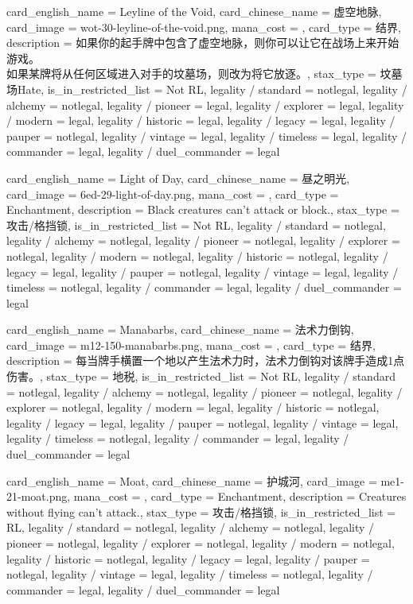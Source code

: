 \documentclass[lang = cn, color = black, 10pt]{AllThatStax}
\begin{document}
\card
{
	card_english_name = {Leyline of the Void},
	card_chinese_name = {虚空地脉},
	card_image = wot-30-leyline-of-the-void.png,
	mana_cost = ,
	card_type = 结界,
	description = {如果你的起手牌中包含了虚空地脉，则你可以让它在战场上来开始游戏。\\
		如果某牌将从任何区域进入对手的坟墓场，则改为将它放逐。},
	stax_type = 坟墓场Hate,
	is_in_restricted_list = Not RL,
	legality / standard = notlegal,
	legality / alchemy = notlegal,
	legality / pioneer = legal,
	legality / explorer = legal,
	legality / modern = legal,
	legality / historic = legal,
	legality / legacy = legal,
	legality / pauper = notlegal,
	legality / vintage = legal,
	legality / timeless = legal,
	legality / commander = legal,
	legality / duel_commander = legal
}

\card
{
	card_english_name = {Light of Day},
	card_chinese_name = {昼之明光},
	card_image = 6ed-29-light-of-day.png,
	mana_cost = ,
	card_type = Enchantment,
	description = {Black creatures can't attack or block.},
	stax_type = 攻击/格挡锁,
	is_in_restricted_list = Not RL,
	legality / standard = notlegal,
	legality / alchemy = notlegal,
	legality / pioneer = notlegal,
	legality / explorer = notlegal,
	legality / modern = notlegal,
	legality / historic = notlegal,
	legality / legacy = legal,
	legality / pauper = notlegal,
	legality / vintage = legal,
	legality / timeless = notlegal,
	legality / commander = legal,
	legality / duel_commander = legal
}

\card
{
	card_english_name = {Manabarbs},
	card_chinese_name = {法术力倒钩},
	card_image = m12-150-manabarbs.png,
	mana_cost = ,
	card_type = 结界,
	description = {每当牌手横置一个地以产生法术力时，法术力倒钩对该牌手造成1点伤害。},
	stax_type = 地税,
	is_in_restricted_list = Not RL,
	legality / standard = notlegal,
	legality / alchemy = notlegal,
	legality / pioneer = notlegal,
	legality / explorer = notlegal,
	legality / modern = legal,
	legality / historic = notlegal,
	legality / legacy = legal,
	legality / pauper = notlegal,
	legality / vintage = legal,
	legality / timeless = notlegal,
	legality / commander = legal,
	legality / duel_commander = legal
}

\card
{
	card_english_name = {Moat},
	card_chinese_name = {护城河},
	card_image = me1-21-moat.png,
	mana_cost = ,
	card_type = Enchantment,
	description = {Creatures without flying can't attack.},
	stax_type = 攻击/格挡锁,
	is_in_restricted_list = RL,
	legality / standard = notlegal,
	legality / alchemy = notlegal,
	legality / pioneer = notlegal,
	legality / explorer = notlegal,
	legality / modern = notlegal,
	legality / historic = notlegal,
	legality / legacy = legal,
	legality / pauper = notlegal,
	legality / vintage = legal,
	legality / timeless = notlegal,
	legality / commander = legal,
	legality / duel_commander = legal
}
\end{document}
